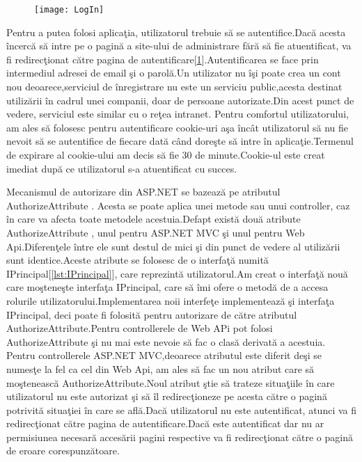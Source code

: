 \documentclass[a4paper,12pt]{report}
\let\oldref\ref
\renewcommand{\ref}[1]{[\oldref{#1}]}
\begin{document}
\begin{figure}[ht]
	\texttt{[image: LogIn]}
	\label{fig:LogIn}
\end{figure}
Pentru a putea folosi aplica\c tia, utilizatorul trebuie s\u a se autentifice.Dac\u a acesta \^incerc\u a s\u a intre pe o pagin\u a a site-ului
de administrare f\u ar\u a s\u a fie atuentificat, va fi redirec\c tionat c\u atre pagina de autentificare\ref{fig:LogIn}.Autentificarea se face prin 
intermediul adresei de email \c si o parol\u a.Un utilizator nu \^i\c si poate crea un cont nou deoarece,serviciul 
de \^inregistrare nu este un serviciu public,acesta destinat utiliz\u arii \^in cadrul unei companii, doar de 
persoane autorizate.Din acest punct de vedere, serviciul este similar cu o re\c tea intranet.
Pentru comfortul utilizatorului, am ales s\u a folosesc pentru autentificare cookie-uri a\c sa \^inc\^at
utilizatorul s\u a nu fie nevoit s\u a se autentifice de fiecare dat\u a c\^and dore\c ste s\u a intre \^in
aplica\c tie.Termenul de expirare al cookie-ului am decis s\u a fie 30 de minute.Cookie-ul este creat imediat dup\u a ce 
utilizatorul s-a atuentificat cu succes.

Mecanismul de autorizare din ASP.NET se bazeaz\u a pe atributul AuthorizeAttribute . Acesta se poate aplica unei metode
sau unui controller, caz \^in care va afecta toate metodele acestuia.Defapt exist\u a dou\u a atribute AuthorizeAttribute ,
unul pentru ASP.NET MVC \c si unul pentru Web Api.Diferen\c tele \^intre ele sunt destul de mici \c si din punct de vedere al utiliz\u arii
sunt identice.Aceste atribute se folosesc de o interfa\c t\u a numit\u a IPrincipal\ref{lst:IPrincipal}, care reprezint\u a utilizatorul.Am creat o interfa\c t\u a nou\u a care mo\c stene\c ste 
interfa\c ta IPrincipal, care s\u a \^imi ofere o metod\u a de a accesa rolurile utilizatorului.Implementarea noii interfe\c te implementeaz\u a
\c si interfa\c ta IPrincipal, deci poate fi folosit\u a pentru autorizare de c\u atre atributul AuthorizeAttribute.Pentru 
controllerele de Web APi pot folosi AuthorizeAttribute  \c si nu mai este nevoie s\u a fac o clas\u a derivat\u a a acestuia.
Pentru controllerele ASP.NET MVC,deoarece atributul este diferit de\c si se numes\c te la fel ca cel din Web Api, am ales s\u a
fac un nou atribut care s\u a mo\c steneasc\u a AuthorizeAttribute.Noul atribut \c stie s\u a trateze situa\c tiile 
\^in care utilizatorul nu este autorizat \c si s\u a \^il redirec\c tioneze pe acesta c\u atre o pagin\u a potrivit\u a situa\c tiei \^in 
care se afl\u a.Dac\u a utilizatorul nu este autentificat, atunci va fi redirec\c tionat c\u atre pagina de autentificare.Dac\u a 
este autentificat dar nu ar permisiunea necesar\u a acces\u arii pagini respective va fi redirec\c tionat c\u atre o pagin\u a de eroare 
corespunz\u atoare.
\end{document}
